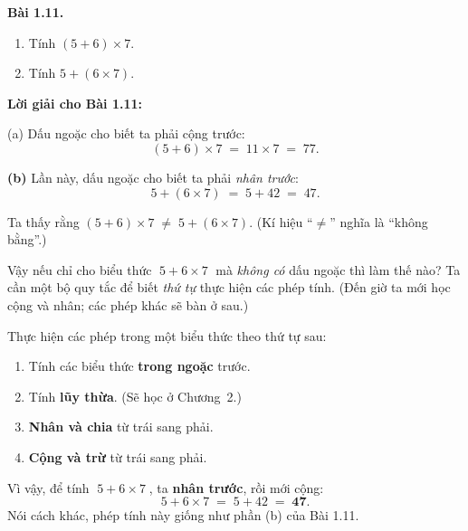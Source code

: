 \documentclass[14pt,a4paper]{extbook}
\newenvironment{problem}[1][]{
  \par\noindent\textbf{Bài #1.}\ \ignorespaces
}{\par}
\begin{document}
\begin{problem}[1.11]
\begin{enumerate}[label=(\alph*)]
  \item Tính \((5+6)\times7\).
  \item Tính \(5+(6\times7)\).
\end{enumerate}
\end{problem}

\noindent\textbf{Lời giải cho Bài 1.11:}

\noindent(a)\; Dấu ngoặc cho biết ta phải cộng trước:
\[
(5+6)\times7 \;=\; 11\times7 \;=\; 77.
\]



\noindent\textbf{(b)} Lần này, dấu ngoặc cho biết ta phải \emph{nhân trước}:
\[
5 + (6\times7) \;=\; 5 + 42 \;=\; 47.
\]

Ta thấy rằng \((5+6)\times7 \;\neq\; 5 + (6\times7)\). (Kí hiệu “\(\neq\)”
nghĩa là “không bằng”.)

Vậy nếu chỉ cho biểu thức \(\;5 + 6\times7\;\) mà \emph{không có} dấu ngoặc
thì làm thế nào? Ta cần một bộ quy tắc để biết \emph{thứ tự} thực hiện các
phép tính. (Đến giờ ta mới học cộng và nhân; các phép khác sẽ bàn ở sau.)

\begin{tcolorbox}[colback=yellow!10, colframe=orange!80!black,
title={Quan trọng: Thứ tự thực hiện phép tính}]
Thực hiện các phép trong một biểu thức theo thứ tự sau:
\begin{enumerate}
  \item Tính các biểu thức \textbf{trong ngoặc} trước.
  \item Tính \textbf{lũy thừa}. (Sẽ học ở Chương~2.)
  \item \textbf{Nhân và chia} từ trái sang phải.
  \item \textbf{Cộng và trừ} từ trái sang phải.
\end{enumerate}
\end{tcolorbox}

Vì vậy, để tính \(\;5 + 6\times7\;\), ta \textbf{nhân trước}, rồi mới cộng:
\[
5 + 6\times7 \;=\; 5 + 42 \;=\; \mathbf{47}.
\]
Nói cách khác, phép tính này giống như phần (b) của Bài 1.11.
\end{document}

